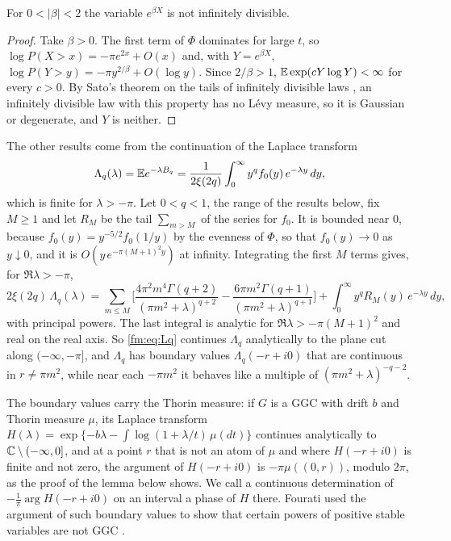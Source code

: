 \begin{proposition}\label{fm:prop:notid}
For $0<|\beta|<2$ the variable $e^{\beta X}$ is not infinitely divisible.
\end{proposition}

\begin{proof}
Take $\beta>0$. The first term of $\Phi$ dominates for large $t$, so $\log P(X>x)=-\pi e^{2x}+O(x)$ and, with $Y=e^{\beta X}$, $\log P(Y>y)=-\pi y^{2/\beta}+O(\log y)$. Since $2/\beta>1$, $\mathbb{E}\exp(cY\log Y)<\infty$ for every $c>0$. By Sato's theorem on the tails of infinitely divisible laws \cite[Theorem 26.1]{Sato99}, an infinitely divisible law with this property has no L\'evy measure, so it is Gaussian or degenerate, and $Y$ is neither.
\end{proof}

The other results come from the continuation of the Laplace transform
\[
\Lambda_q(\lambda)=\mathbb{E} e^{-\lambda B_q}=\frac1{2\xi(2q)}\int_0^\infty y^qf_0(y)\,e^{-\lambda y}\,dy,
\]
which is finite for $\lambda>-\pi$. Let $0<q<1$, the range of the results below, fix $M\ge1$ and let $R_M$ be the tail $\sum_{m>M}$ of the series for $f_0$. It is bounded near $0$, because $f_0(y)=y^{-5/2}f_0(1/y)$ by the evenness of $\Phi$, so that $f_0(y)\to0$ as $y\downarrow0$, and it is $O(y\,e^{-\pi(M+1)^2y})$ at infinity. Integrating the first $M$ terms gives, for $\Re\lambda>-\pi$,
\begin{equation}\label{fm:eq:Lq}
2\xi(2q)\,\Lambda_q(\lambda)=\sum_{m\le M}\Big[\frac{4\pi^2m^4\Gamma(q+2)}{(\pi m^2+\lambda)^{q+2}}-\frac{6\pi m^2\Gamma(q+1)}{(\pi m^2+\lambda)^{q+1}}\Big]+\int_0^\infty y^qR_M(y)\,e^{-\lambda y}\,dy ,
\end{equation}
with principal powers. The last integral is analytic for $\Re\lambda>-\pi(M+1)^2$ and real on the real axis. So \eqref{fm:eq:Lq} continues $\Lambda_q$ analytically to the plane cut along $(-\infty,-\pi]$, and $\Lambda_q$ has boundary values $\Lambda_q(-r+i0)$ that are continuous in $r\ne\pi m^2$, while near each $-\pi m^2$ it behaves like a multiple of $(\pi m^2+\lambda)^{-q-2}$.

The boundary values carry the Thorin measure: if $G$ is a GGC with drift $b$ and Thorin measure $\mu$, its Laplace transform $H(\lambda)=\exp\{-b\lambda-\int\log(1+\lambda/t)\,\mu(dt)\}$ continues analytically to $\mathbb{C}\setminus(-\infty,0]$, and at a point $r$ that is not an atom of $\mu$ and where $H(-r+i0)$ is finite and not zero, the argument of $H(-r+i0)$ is $-\pi\mu((0,r))$, modulo $2\pi$, as the proof of the lemma below shows. We call a continuous determination of $-\frac1\pi\arg H(-r+i0)$ on an interval a phase of $H$ there. Fourati used the argument of such boundary values to show that certain powers of positive stable variables are not GGC \cite{Fourati16}.


